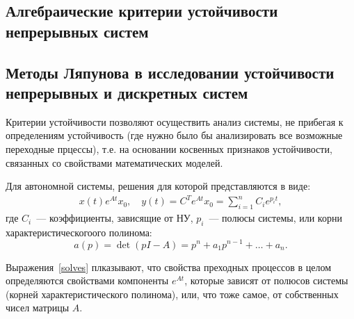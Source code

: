 \subsection{Алгебраические критерии устойчивости непрерывных систем}
\subsection{Методы Ляпунова в исследовании устойчивости непрерывных и дискретных систем}

Критерии устойчивости позволяют осуществить анализ системы, не прибегая к определениям устойчивость (где нужно было бы анализировать все возможные переходные прцессы), т.е. на основании косвенных признаков устойчивости, связанных со свойствами математических моделей.

Для автономной системы, решения для которой представляются в виде:
\begin{gather}\label{solves}
    x(t) e^{At}x_0,
    \quad
    y(t) = C^T e^{At} x_0 = \sum\limits_{i=1}^{n} C_i e^{p_i t},
\end{gather}
где $C_i$~--- коэффициенты, зависящие от НУ, $p_i$~--- полюсы системы, или корни характеристическогоого полинома:
\begin{equation}
    a(p) = \det(pI - A) = p^n + a_1 p^{n-1} + \dots + a_n.
\end{equation}

Выражения~\eqref{solves} плказывают, что свойства преходных процессов в целом определяются свойствами компоненты $e^{At}$, которые зависят от полюсов системы (корней характеристического полинома), или, что тоже самое, от собственных чисел матрицы $A$. 

